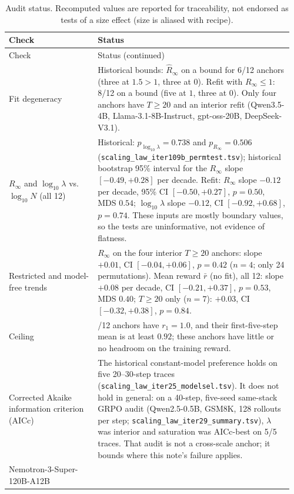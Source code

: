 \documentclass[11pt]{article}
\begin{document}
\begingroup
\small
\begin{longtable}{@{}p{0.30\linewidth}>{\raggedright\arraybackslash}p{0.66\linewidth}@{}}
\caption{Audit status. Recomputed values are reported for traceability, not
endorsed as tests of a size effect (size is aliased with recipe).}
\label{tab:neg}\\
\toprule
Check & Status \\
\midrule
\endfirsthead
\toprule
Check & Status (continued) \\
\midrule
\endhead
Fit degeneracy &
Historical bounds: $\hat R_\infty$ on a bound for 6/12 anchors (three at
$1.5>1$, three at $0$). Refit with $R_\infty\le 1$: 8/12 on a bound (five at
$1$, three at $0$). Only four anchors have $T\ge 20$ and an interior refit
(Qwen3.5-4B, Llama-3.1-8B-Instruct, gpt-oss-20B, DeepSeek-V3.1). \\
$R_\infty$ and $\log_{10}\lambda$ vs.\ $\log_{10}N$ (all 12) &
Historical: $p_{\log_{10}\lambda}=0.738$ and $p_{R_\infty}=0.506$
(\nolinkurl{scaling_law_iter109b_permtest.tsv}); historical bootstrap 95\%
interval for the $R_\infty$ slope $[-0.49,+0.28]$ per decade. Refit: $R_\infty$
slope $-0.12$ per decade, 95\% CI $[-0.50,+0.27]$, $p=0.50$, MDS $0.54$;
$\log_{10}\lambda$ slope $-0.12$, CI $[-0.92,+0.68]$, $p=0.74$. These inputs
are mostly boundary values, so the tests are uninformative, not evidence of
flatness. \\
Restricted and model-free trends &
$R_\infty$ on the four interior $T\ge 20$ anchors: slope $+0.01$, CI
$[-0.04,+0.06]$, $p=0.42$ ($n=4$; only 24 permutations). Mean reward
$\bar r$ (no fit), all 12: slope $+0.08$ per decade, CI $[-0.21,+0.37]$,
$p=0.53$, MDS $0.40$; $T\ge 20$ only ($n=7$): $+0.03$, CI $[-0.32,+0.38]$,
$p=0.84$. \\
Ceiling &
5/12 anchors have $r_1=1.0$, and their first-five-step mean is at least $0.92$;
these anchors have little or no headroom on the training reward. \\
Corrected Akaike information criterion (AICc)~\cite{hurvich1989aicc} &
The historical constant-model preference holds on five 20--30-step traces
(\nolinkurl{scaling_law_iter25_modelsel.tsv}). It does not hold in general: on
a 40-step, five-seed same-stack GRPO audit (Qwen2.5-0.5B, GSM8K, 128 rollouts
per step; \nolinkurl{scaling_law_iter29_summary.tsv}), $\lambda$ was interior
and saturation was AICc-best on 5/5 traces. That audit is not a cross-scale
anchor; it bounds where this note's failure applies. \\
Nemotron-3-Super-120B-A12B &

\end{longtable}
\end{document}
